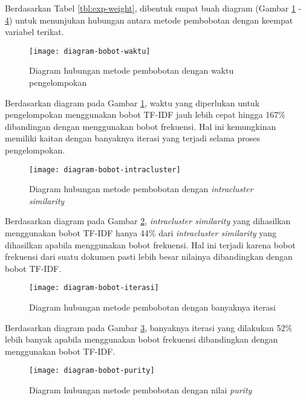 \begin{enumerate}
		Berdasarkan Tabel \ref{tbl:exp-weight}, dibentuk empat buah diagram (Gambar \ref{fig:graph:weight-time} - \ref{fig:graph:weight-purity}) untuk menunjukan hubungan antara metode pembobotan dengan keempat variabel terikat.
		
		\begin{figure}[H]
			\centering
			\texttt{[image: diagram-bobot-waktu]}
			\caption{Diagram hubungan metode pembobotan dengan waktu pengelompokan}
			\label{fig:graph:weight-time}
		\end{figure}
		
		Berdasarkan diagram pada Gambar \ref{fig:graph:weight-time}, waktu yang diperlukan untuk pengelompokan menggunakan bobot TF-IDF jauh lebih cepat hingga 167\% dibandingan dengan menggunakan bobot frekuensi. Hal ini kemungkinan memiliki kaitan dengan banyaknya iterasi yang terjadi selama proses pengelompokan.
		
		\begin{figure}[H]
			\centering
			\texttt{[image: diagram-bobot-intracluster]}
			\caption{Diagram hubungan metode pembobotan dengan \textit{intracluster similarity}}
			\label{fig:graph:weight-intra}
		\end{figure}
		
		Berdasarkan diagram pada Gambar \ref{fig:graph:weight-intra}, \textit{intracluster similarity} yang dihasilkan menggunakan bobot TF-IDF hanya 44\% dari \textit{intracluster similarity} yang dihasilkan apabila menggunakan bobot frekuensi. Hal ini terjadi karena bobot frekuensi dari suatu dokumen pasti lebih besar nilainya dibandingkan dengan bobot TF-IDF.
		
		\begin{figure}[H]
			\centering
			\texttt{[image: diagram-bobot-iterasi]}
			\caption{Diagram hubungan metode pembobotan dengan banyaknya iterasi}
			\label{fig:graph:weight-iteration}
		\end{figure}
		
		Berdasarkan diagram pada Gambar \ref{fig:graph:weight-iteration}, banyaknya iterasi yang dilakukan 52\% lebih banyak apabila menggunakan bobot frekuensi dibandingkan dengan menggunakan bobot TF-IDF.
		
		\begin{figure}[H]
			\centering
			\texttt{[image: diagram-bobot-purity]}
			\caption{Diagram hubungan metode pembobotan dengan nilai \textit{purity}}
			\label{fig:graph:weight-purity}
		\end{figure}
		

\end{enumerate}
